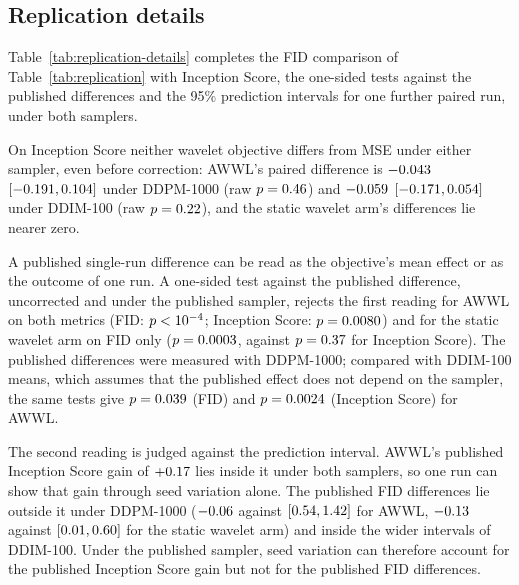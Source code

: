 
\subsection{Replication details}
\label{app:supp-replication}

Table~\ref{tab:replication-details} completes the FID comparison of
Table~\ref{tab:replication} with Inception Score, the one-sided tests against
the published differences and the 95\% prediction intervals for one further
paired run, under both samplers.


On Inception Score neither wavelet objective differs from MSE under either
sampler, even before correction: AWWL's paired difference is $-0.043$
$[-0.191, 0.104]$ under DDPM-1000 (raw $p = 0.46$)
and $-0.059$ $[-0.171, 0.054]$ under DDIM-100 (raw
$p = 0.22$), and the static wavelet arm's differences lie nearer zero.

A published single-run difference can be read as the objective's mean effect
or as the outcome of one run. A one-sided test against the published
difference, uncorrected and under the published sampler, rejects the first
reading for AWWL on both metrics (FID: $p <10^{-4}$; Inception Score:
$p = 0.0080$) and for the static wavelet arm on FID only
($p = 0.0003$, against $p = 0.37$ for Inception
Score). The published differences were measured with DDPM-1000; compared with
DDIM-100 means, which assumes that the published effect does not depend on
the sampler, the same tests give $p = 0.039$ (FID) and
$p = 0.0024$ (Inception Score) for AWWL.

The second reading is judged against the prediction interval. AWWL's
published Inception Score gain of $+0.17$ lies inside it under both
samplers, so one run can show that gain through seed variation alone. The
published FID differences lie outside it under DDPM-1000 ($-0.06$
against $[0.54, 1.42]$ for AWWL, $-0.13$
against $[0.01, 0.60]$ for the static wavelet
arm) and inside the wider intervals of DDIM-100. Under the published sampler,
seed variation can therefore account for the published Inception Score gain
but not for the published FID differences.

